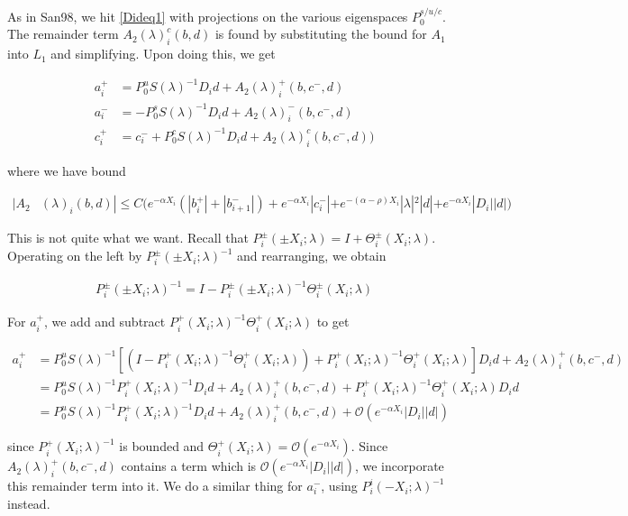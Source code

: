 \documentclass[12pt]{article}
\begin{document}
As in San98, we hit \eqref{Dideq1} with projections on the various eigenspaces $P_0^{s/u/c}$. The remainder term $A_2(\lambda)_i^c(b, d)$ is found by substituting the bound for $A_1$ into $L_1$ and simplifying. Upon doing this, we get

\begin{align*}
a_i^+ &= P_0^u S(\lambda)^{-1} D_i d + A_2(\lambda)_i^+(b, c^-, d) \\
a_i^- &= -P_0^s S(\lambda)^{-1} D_i d + A_2(\lambda)_i^-(b, c^-, d) \\
c_i^+ &= c_i^- + P_0^c S(\lambda)^{-1} D_i d + A_2(\lambda)_i^c(b, c^-, d) )
\end{align*}

where we have bound

\begin{align*}
|A_2&(\lambda)_i(b, d)|
\leq C \Big( e^{-\alpha X_i} (|b_i^+| + |b_{i+1}^-|) + e^{-\alpha X_i} |c_i^-| + e^{-(\alpha - \rho) X_i} |\lambda|^2|d| + e^{-\alpha X_i} |D_i||d| \Big)
\end{align*} 

This is not quite what we want. Recall that $P_i^\pm(\pm X_i; \lambda) = I + \Theta_i^\pm(X_i; \lambda)$. Operating on the left by $P_i^\pm(\pm X_i; \lambda)^{-1}$ and rearranging, we obtain

\begin{align*}
P_i^\pm(\pm X_i; \lambda)^{-1} = I - P_i^\pm(\pm X_i; \lambda)^{-1} \Theta_i^\pm(X_i; \lambda)
\end{align*}

For $a_i^+$, we add and subtract $P_i^+(X_i; \lambda)^{-1} \Theta_i^+(X_i; \lambda)$ to get

\begin{align*}
a_i^+ &= P_0^u S(\lambda)^{-1} [(I - P_i^+(X_i; \lambda)^{-1} \Theta_i^+(X_i; \lambda)) + P_i^+(X_i; \lambda)^{-1} \Theta_i^+(X_i; \lambda)] D_i d + A_2(\lambda)_i^+(b, c^-, d) \\
&= P_0^u S(\lambda)^{-1} P_i^+(X_i; \lambda)^{-1} D_i d + A_2(\lambda)_i^+(b, c^-, d) + P_i^+(X_i; \lambda)^{-1} \Theta_i^+(X_i; \lambda) D_i d\\
&= P_0^u S(\lambda)^{-1} P_i^+(X_i; \lambda)^{-1} D_i d + A_2(\lambda)_i^+(b, c^-, d) + \mathcal{O}(e^{-\alpha X_i} |D_i||d|)
\end{align*}

since $P_i^+(X_i; \lambda)^{-1}$ is bounded and $\Theta_i^+(X_i; \lambda) = \mathcal{O}(e^{-\alpha X_i})$. Since $A_2(\lambda)_i^+(b, c^-, d)$ contains a term which is $\mathcal{O}(e^{-\alpha X_i} |D_i||d|)$, we incorporate this remainder term into it. We do a similar thing for $a_i^-$, using $P_i^i(-X_i; \lambda)^{-1}$ instead.
\end{document}
